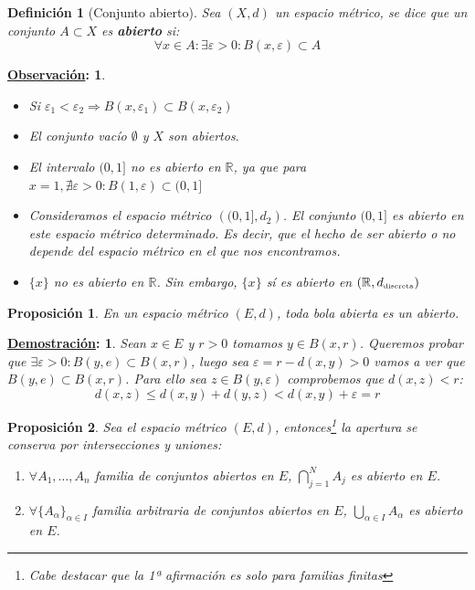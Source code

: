 \documentclass[10pt,a4paper,openright]{book}
\theoremstyle{break}
\newtheorem*{defi}{Definición}
\newtheorem*{prop}{Proposición}
\newtheorem*{demo}{\underline{Demostración}:}
\newtheorem*{obs}{\underline{Observación}:}
\begin{document}
\begin{defi}[Conjunto abierto]
Sea $(X,d)$ un espacio métrico, se dice que un conjunto $A \subset X$ es \textbf{abierto} si:
$$\forall x \in A : \exists \varepsilon > 0 : B(x,\varepsilon) \subset A$$
\end{defi}

\begin{obs}
\begin{itemize}
\item Si $\varepsilon_1 < \varepsilon_2 \Rightarrow B(x,\varepsilon_1) \subset B(x,\varepsilon_2)$

\item El conjunto vacío $\emptyset$ y $X$ son abiertos.

\item El intervalo $(0,1]$ no es abierto en $\mathbb{R}$, ya que para $x=1, \nexists \varepsilon > 0 : B(1,\varepsilon) \subset (0,1]$

\item Consideramos el espacio métrico $\left( (0,1], d_2 \right)$. El conjunto $(0,1]$ es abierto en este espacio métrico determinado. Es decir, que el hecho de ser abierto o no depende del espacio métrico en el que nos encontramos.

\item $\{x\}$ no es abierto en $\mathbb{R}$. Sin embargo, $\{x\}$ sí es abierto en $(\mathbb{R}, d_{\mbox{\tiny discreta}})$
\end{itemize}
\end{obs}


\begin{prop}
En un espacio métrico $(E,d)$, toda bola abierta es un abierto.
\end{prop}

\begin{demo}
Sean $x \in E$ y $r>0$ tomamos $y \in B(x,r)$. Queremos probar que $\exists \varepsilon > 0 : B(y,e) \subset B(x,r)$, luego sea $\varepsilon = r - d(x,y) > 0$ vamos a ver que $B(y,e) \subset B(x,r)$. Para ello sea $z \in B(y, \varepsilon)$ comprobemos que $d(x,z) < r$:
$$d(x,z) \leq d(x,y) + d(y,z) < d(x,y) + \varepsilon = r$$
\end{demo}

\begin{prop}
Sea el espacio métrico $(E,d)$, entonces\footnote{Cabe destacar que la 1ª afirmación es solo para familias finitas} la apertura se conserva por intersecciones y uniones:
\begin{enumerate}
\item $\forall A_1, \ldots, A_n$ familia de conjuntos abiertos en $E$, $\displaystyle\bigcap_{j=1}^N A_j$ es abierto en $E$.

\item $\forall \{A_\alpha\}_{\alpha \in I}$ familia arbitraria de conjuntos abiertos en $E$, $\displaystyle \bigcup_{\alpha \in I} A_\alpha$ es abierto en $E$.
\end{enumerate}
\end{prop}
\end{document}
